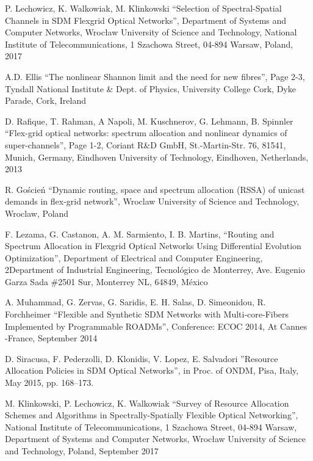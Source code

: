 \documentclass[conference]{IEEEtran}
\begin{document}
\begin{thebibliography}{00}

 P. Lechowicz, K. Walkowiak, M. Klinkowski ``Selection of Spectral-Spatial Channels in SDM
Flexgrid Optical Networks'', Department of Systems and Computer Networks, Wrocław University of Science and Technology, National Institute of Telecommunications, 1 Szachowa Street, 04-894 Warsaw, Poland, 2017

 A.D. Ellis ``The nonlinear Shannon limit and the need for new fibres'', Page 2-3, Tyndall National Institute \& Dept. of Physics, University College Cork, Dyke Parade, Cork, Ireland

 D. Rafique, T. Rahman, A Napoli, M. Kuschnerov, G. Lehmann, B. Spinnler ``Flex-grid optical networks: spectrum allocation and nonlinear dynamics of super-channels'', Page 1-2, Coriant R\&D GmbH, St.-Martin-Str. 76, 81541, Munich, Germany, Eindhoven University of Technology, Eindhoven, Netherlands, 2013

 R. Goścień ``Dynamic routing, space and spectrum allocation (RSSA) of unicast demands in flex-grid network'', Wroclaw University of Science and Technology, Wroclaw, Poland

 F. Lezama, G. Castanon, A. M. Sarmiento, I. B. Martins, ``Routing and Spectrum Allocation in Flexgrid Optical Networks
Using Differential Evolution Optimization'', Department of Electrical and Computer Engineering, 2Department of Industrial Engineering,
Tecnológico de Monterrey, Ave. Eugenio Garza Sada \#2501 Sur, Monterrey NL, 64849, México

 A. Muhammad, G. Zervas, G. Saridis, E. H. Salas, D. Simeonidou, R. Forchheimer ``Flexible and Synthetic SDM Networks with Multi-core-Fibers Implemented by Programmable ROADMs'', Conference: ECOC 2014, At Cannes -France, September 2014

 D. Siracusa, F. Pederzolli, D. Klonidis, V. Lopez, E. Salvadori ''Resource Allocation Policies in
SDM Optical Networks'',  in Proc. of ONDM, Pisa, Italy, May 2015, pp. 168–173.

 M. Klinkowski, P. Lechowicz, K. Walkowiak ``Survey of Resource Allocation Schemes and Algorithms in Spectrally-Spatially Flexible Optical Networking'', National Institute of Telecommunications, 1 Szachowa Street, 04-894 Warsaw, Department of Systems and Computer Networks, Wrocław University of Science and Technology, Poland, September 2017


\end{thebibliography}
\end{document}
